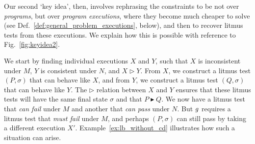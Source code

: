 Our second `key idea', then, involves rephrasing the constraints to be
not over \emph{programs}, but over \emph{program executions}, where
they become much cheaper to solve (see
Def.~\ref{def:general_problem_executions}, below), and then to recover
litmus tests from these executions. We explain how this is possible
with reference to Fig.~\ref{fig:keyidea2}.

We start by finding individual executions $X$ and $Y$, such that $X$
is inconsistent under $M$, $Y$ is consistent under $N$, and
$X\triangleright Y$.  From $X$, we construct a litmus test
$(P,\sigma)$ that can behave like $X$, and from $Y$, we construct a
litmus test $(Q,\sigma)$ that can behave like $Y$. The
$\triangleright$ relation between $X$ and $Y$ ensures that these
litmus tests will have the same final state $\sigma$ and that
$P\blacktriangleright Q$. We now have a litmus test that \emph{can
fail} under $M$ and another that \emph{can pass} under $N$. But
$g$ requires a litmus test that \emph{must fail} under $M$,
and perhaps $(P,\sigma)$ can still pass by taking a different
execution $X'$. Example~\ref{ex:lb_without_cd} illustrates how such a
situation can arise.


